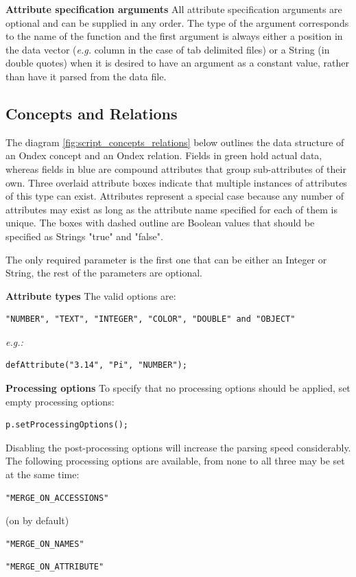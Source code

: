 \textbf{Attribute specification arguments}
All attribute specification arguments are optional and can be supplied in any order. 
The type of the argument corresponds to the name of the function and the first argument is always either a position in the data vector 
(\textit{e.g.} column in the case of tab delimited files) or a String (in double quotes) when it is desired to have an argument as a constant value, 
rather than have it parsed from the data file.



\subsection{Concepts and Relations}
The diagram \ref{fig:script_concepts_relations} below outlines the data structure of an Ondex concept and an Ondex relation. 
Fields in green hold actual data, whereas fields in blue are compound attributes that group sub-attributes of their own. 
Three overlaid attribute boxes indicate that multiple instances of attributes of this type can exist. 
Attributes represent a special case because any number of attributes may exist as long as the attribute name specified for each of them is unique. 
The boxes with dashed outline are Boolean values that should be specified as Strings "true" and "false".

The only required parameter is the first one that can be either an Integer or String, the rest of the parameters are optional. 

\textbf{Attribute types}
The valid options are: 
\begin{verbatim}"NUMBER", "TEXT", "INTEGER", "COLOR", "DOUBLE" and "OBJECT"\end{verbatim}
\textit{e.g.:} 
\begin{verbatim}defAttribute("3.14", "Pi", "NUMBER");\end{verbatim}

\textbf{Processing options}
To specify that no processing options should be applied, set empty processing options:
\begin{verbatim}p.setProcessingOptions();\end{verbatim}
Disabling the post-processing options will increase the parsing speed considerably. 
The following processing options are available, from none to all three may be set at the same time: 
\begin{verbatim}"MERGE_ON_ACCESSIONS"\end{verbatim} (on by default)
\begin{verbatim}"MERGE_ON_NAMES"\end{verbatim}
\begin{verbatim}"MERGE_ON_ATTRIBUTE"\end{verbatim}

